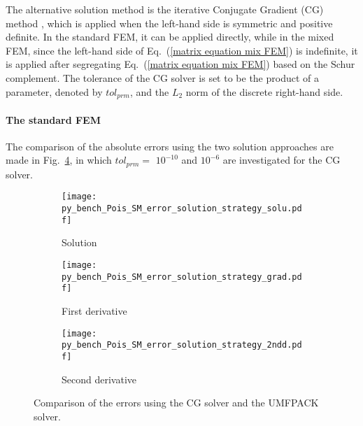 \documentclass[review,3p]{elsarticle}
\begin{document}
The alternative solution method is the iterative Conjugate Gradient (CG) method \cite{ginsburg1963cg}, which is applied when the left-hand side is symmetric and positive definite.
In the standard FEM, it can be applied directly, while in the mixed FEM, since the left-hand side of Eq.~(\ref{matrix equation mix FEM}) is indefinite, it is applied after segregating Eq.~(\ref{matrix equation mix FEM}) based on the Schur complement.
The tolerance of the CG solver is set to be the product of a parameter, denoted by $tol_{prm}$, and the $L_2$ norm of the discrete right-hand side.



\paragraph{The standard FEM}

The comparison of the absolute errors using the two solution approaches are made in Fig.~\ref{py_bench_Pois_SM_error_solution_strategy}, in which $tol_{prm}=$ $10^{-10}$ and $10^{-6}$ are investigated for the CG solver.

\begin{figure}[!ht]
    \begin{subfigure}{5.5cm}
        \texttt{[image: py\_bench\_Pois\_SM\_error\_solution\_strategy\_solu.pdf]}
        \caption{Solution}
        \label{py_bench_Pois_SM_error_solution_strategy_solu}
    \end{subfigure}
    \hspace{-0.2cm}
    \begin{subfigure}{5.5cm}
        \texttt{[image: py\_bench\_Pois\_SM\_error\_solution\_strategy\_grad.pdf]}
        \caption{First derivative}
        \label{py_bench_Pois_SM_error_solution_strategy_grad}
    \end{subfigure}
    \hspace{-0.2cm}
    \begin{subfigure}{5.5cm}
        \texttt{[image: py\_bench\_Pois\_SM\_error\_solution\_strategy\_2ndd.pdf]}
        \caption{Second derivative}
        \label{py_bench_Pois_SM_error_solution_strategy_2ndd}
    \end{subfigure}
\caption{Comparison of the errors using the CG solver and the UMFPACK solver.}
\label{py_bench_Pois_SM_error_solution_strategy}
\end{figure}
\end{document}
